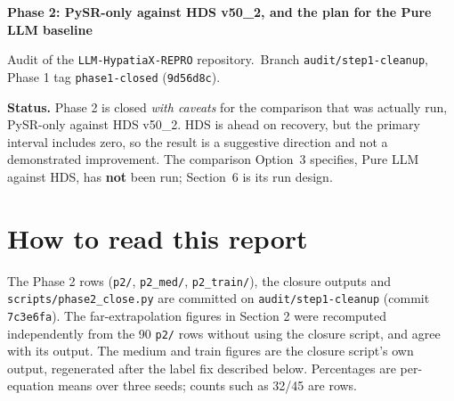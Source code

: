 \documentclass[11pt,a4paper]{article}
\newcommand{\code}[1]{\texttt{#1}}
\begin{document}
{\Large\bfseries\color{ink} Phase 2: PySR-only against HDS v50\_2, and the plan for the Pure LLM baseline}\par
\vspace{2pt}
{\small Audit of the \code{LLM-HypatiaX-REPRO} repository.\ Branch \code{audit/step1-cleanup}, Phase 1 tag \code{phase1-closed} (\code{9d56d8c}).}
\vspace{6pt}

\begin{status}
\textbf{Status.} Phase 2 is closed \emph{with caveats} for the comparison that was actually run, PySR-only against HDS v50\_2. HDS is ahead on recovery, but the primary interval includes zero, so the result is a suggestive direction and not a demonstrated improvement. The comparison Option~3 specifies, Pure LLM against HDS, has \textbf{not} been run; Section~6 is its run design.
\end{status}

\section*{How to read this report}
The Phase 2 rows (\code{p2/}, \code{p2\_med/}, \code{p2\_train/}), the closure outputs and \code{scripts/phase2\_close.py} are committed on \code{audit/step1-cleanup} (commit \code{7c3e6fa}). The far-extrapolation figures in Section 2 were recomputed independently from the 90 \code{p2/} rows without using the closure script, and agree with its output. The medium and train figures are the closure script's own output, regenerated after the label fix described below. Percentages are per-equation means over three seeds; counts such as 32/45 are rows.
\end{document}
